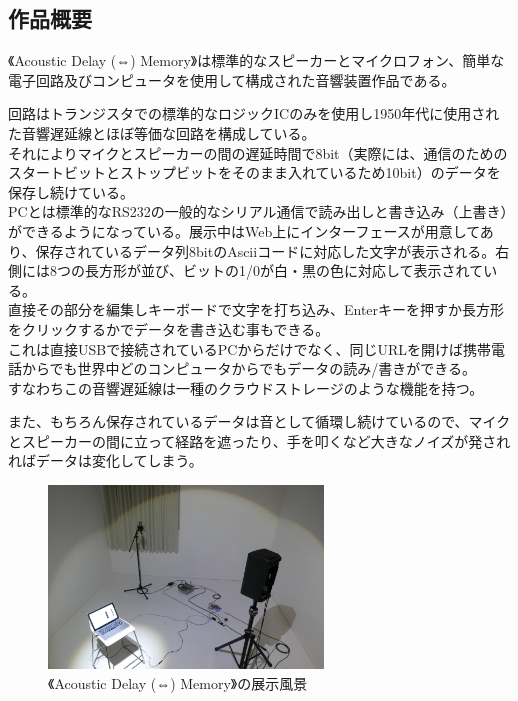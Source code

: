 \documentclass[a4paper,report]{jsbook}
\begin{document}
\subsection{作品概要}\label{ux4f5cux54c1ux6982ux8981-1}

《Acoustic Delay (⇔)
Memory》は標準的なスピーカーとマイクロフォン、簡単な電子回路及びコンピュータを使用して構成された音響装置作品である。

回路はトランジスタでの標準的なロジックICのみを使用し1950年代に使用された音響遅延線とほぼ等価な回路を構成している。\\
それによりマイクとスピーカーの間の遅延時間で8bit（実際には、通信のためのスタートビットとストップビットをそのまま入れているため10bit）のデータを保存し続けている。\\
PCとは標準的なRS232の一般的なシリアル通信で読み出しと書き込み（上書き）ができるようになっている。展示中はWeb上にインターフェースが用意してあり、保存されているデータ列8bitのAsciiコードに対応した文字が表示される。右側には8つの長方形が並び、ビットの1/0が白・黒の色に対応して表示されている。\\
直接その部分を編集しキーボードで文字を打ち込み、Enterキーを押すか長方形をクリックするかでデータを書き込む事もできる。\\
これは直接USBで接続されているPCからだけでなく、同じURLを開けば携帯電話からでも世界中どのコンピュータからでもデータの読み/書きができる。\\
すなわちこの音響遅延線は一種のクラウドストレージのような機能を持つ。

また、もちろん保存されているデータは音として循環し続けているので、マイクとスピーカーの間に立って経路を遮ったり、手を叩くなど大きなノイズが発されればデータは変化してしまう。

\begin{no-prefix-figure-caption}

\begin{figure}[htbp]
\centering
\includegraphics[width=0.65000\textwidth]{./img/adm1_1.JPG}
\caption{《Acoustic Delay (⇔) Memory》の展示風景}
\end{figure}

\end{no-prefix-figure-caption}
\end{document}
